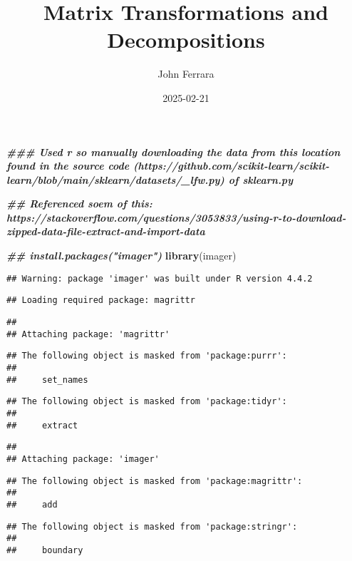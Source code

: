\documentclass[
]{article}
\title{Matrix Transformations and Decompositions}
\author{John Ferrara}
\date{2025-02-21}
\newenvironment{Shaded}{\begin{snugshade}}{\end{snugshade}}
\newcommand{\DocumentationTok}[1]{\textcolor[rgb]{0.56,0.35,0.01}{\textbf{\textit{#1}}}}
\newcommand{\FunctionTok}[1]{\textcolor[rgb]{0.13,0.29,0.53}{\textbf{#1}}}
\newcommand{\NormalTok}[1]{#1}
\begin{document}
\maketitle

\begin{Shaded}
\begin{Highlighting}[]
\DocumentationTok{\#\#\# Used r so manually downloading the data from this location found in the source code (https://github.com/scikit{-}learn/scikit{-}learn/blob/main/sklearn/datasets/\_lfw.py) of sklearn.py }

\DocumentationTok{\#\# Referenced soem of this: https://stackoverflow.com/questions/3053833/using{-}r{-}to{-}download{-}zipped{-}data{-}file{-}extract{-}and{-}import{-}data}

\DocumentationTok{\#\# install.packages("imager")}
\FunctionTok{library}\NormalTok{(imager)}
\end{Highlighting}
\end{Shaded}

\begin{verbatim}
## Warning: package 'imager' was built under R version 4.4.2
\end{verbatim}

\begin{verbatim}
## Loading required package: magrittr
\end{verbatim}

\begin{verbatim}
## 
## Attaching package: 'magrittr'
\end{verbatim}

\begin{verbatim}
## The following object is masked from 'package:purrr':
## 
##     set_names
\end{verbatim}

\begin{verbatim}
## The following object is masked from 'package:tidyr':
## 
##     extract
\end{verbatim}

\begin{verbatim}
## 
## Attaching package: 'imager'
\end{verbatim}

\begin{verbatim}
## The following object is masked from 'package:magrittr':
## 
##     add
\end{verbatim}

\begin{verbatim}
## The following object is masked from 'package:stringr':
## 
##     boundary
\end{verbatim}
\end{document}
